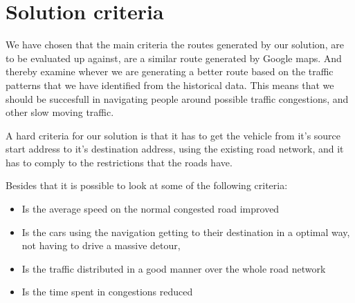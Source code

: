 \section{Solution criteria}
We have chosen that the main criteria the routes generated by our solution, are to be evaluated up against, are a similar route generated by Google maps. And thereby examine whever we are generating a better route based on the traffic patterns that we have identified from the historical data. This means that we should be succesfull in navigating people around possible traffic congestions, and other slow moving traffic.

A hard criteria for our solution is that it has to get the vehicle from it's source start address to it's destination address, using the existing road network, and it has to comply to the restrictions that the roads have.

Besides that it is possible to look at some of the following criteria:
\begin{itemize}
	\item Is the average speed on the normal congested road improved
	\item Is the cars using the navigation getting to their destination in a optimal way, not having to drive a massive detour,
	\item Is the traffic distributed in a good manner over the whole road network
	\item Is the time spent in congestions reduced
\end{itemize}
